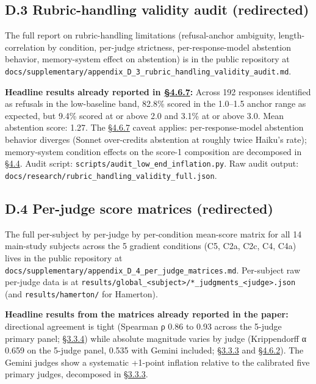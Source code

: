 \hypertarget{d.3-rubric-handling-validity-audit-redirected}{%
\subsection{D.3 Rubric-handling validity audit
(redirected)}\label{d.3-rubric-handling-validity-audit-redirected}}

The full report on rubric-handling limitations (refusal-anchor
ambiguity, length-correlation by condition, per-judge strictness,
per-response-model abstention behavior, memory-system effect on
abstention) is in the public repository at
\texttt{docs/supplementary/appendix\_D\_3\_rubric\_handling\_validity\_audit.md}.

\textbf{Headline results already reported in \hyperref[rubric-handling-limitations-post-hoc-validity-audit-1]{§4.6.7}:} Across 192
responses identified as refusals in the low-baseline band, 82.8\% scored
in the 1.0--1.5 anchor range as expected, but 9.4\% scored at or above
2.0 and 3.1\% at or above 3.0. Mean abstention score: 1.27. The \hyperref[rubric-handling-limitations-post-hoc-validity-audit-1]{§4.6.7}
caveat applies: per-response-model abstention behavior diverges (Sonnet
over-credits abstention at roughly twice Haiku's rate); memory-system
condition effects on the score-1 composition are decomposed in \hyperref[memory-system-composition]{§4.4}.
Audit script: \texttt{scripts/audit\_low\_end\_inflation.py}. Raw audit
output: \texttt{docs/research/rubric\_handling\_validity\_full.json}.

\hypertarget{d.4-per-judge-score-matrices-redirected}{%
\subsection{D.4 Per-judge score matrices
(redirected)}\label{d.4-per-judge-score-matrices-redirected}}

The full per-subject by per-judge by per-condition mean-score matrix for
all 14 main-study subjects across the 5 gradient conditions (C5, C2a,
C2c, C4, C4a) lives in the public repository at
\texttt{docs/supplementary/appendix\_D\_4\_per\_judge\_matrices.md}.
Per-subject raw per-judge data is at
\texttt{results/global\_\textless{}subject\textgreater{}/*\_judgments\_\textless{}judge\textgreater{}.json}
(and \texttt{results/hamerton/} for Hamerton).

\textbf{Headline results from the matrices already reported in the
paper:} directional agreement is tight (Spearman ρ 0.86 to 0.93 across
the 5-judge primary panel; \hyperref[inter-judge-agreement]{§3.3.4}) while absolute magnitude varies by
judge (Krippendorff α 0.659 on the 5-judge panel, 0.535 with Gemini
included; \hyperref[calibration]{§3.3.3} and \hyperref[judge-panel-sensitivity-5-judge-primary-vs-7-judge]{§4.6.2}). The Gemini judges show a systematic
+1-point inflation relative to the calibrated five primary judges,
decomposed in \hyperref[calibration]{§3.3.3}.

